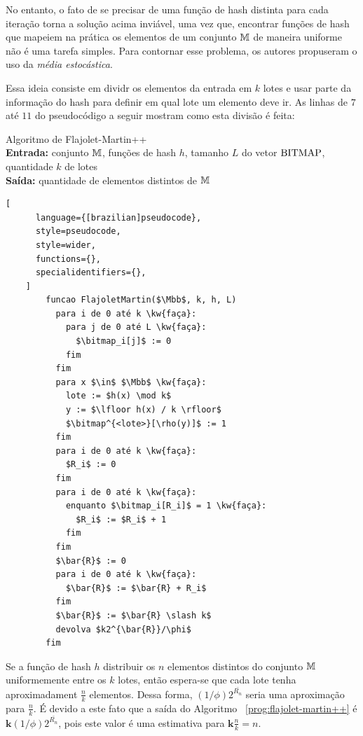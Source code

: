 No entanto, o fato de se precisar de uma função de hash distinta para cada iteração torna a solução acima inviável, 
uma vez que, encontrar funções de hash que mapeiem na prática os elementos de um conjunto $\mathbb{M}$ de maneira
uniforme não é uma tarefa simples. Para contornar esse problema, os autores propuseram o uso da 
\textit{média estocástica}.

Essa ideia consiste em dividr os elementos da entrada em $k$ lotes e usar parte da informação do hash para definir em 
qual lote um elemento deve ir. 
As linhas de $7$ até $11$ do pseudocódigo a seguir mostram como esta divisão é feita:
\begin{programruledcaption}{
  Algoritmo de Flajolet-Martin++
  \\ \textbf{Entrada:} conjunto $\mathbb{M}$, funções de hash $h$, tamanho $L$ do vetor $\text{BITMAP}$, 
  quantidade $k$ de lotes
  \\ \textbf{Saída:} quantidade de elementos distintos de $\mathbb{M}$
  \label{prog:flajolet-martin++}
  }
    \begin{lstlisting}[
      language={[brazilian]pseudocode},
      style=pseudocode,
      style=wider,
      functions={},
      specialidentifiers={},
    ]
        funcao FlajoletMartin($\Mbb$, k, h, L)
          para i de 0 até k \kw{faça}:
            para j de 0 até L \kw{faça}:
              $\bitmap_i[j]$ := 0
            fim
          fim
          para x $\in$ $\Mbb$ \kw{faça}:
            lote := $h(x) \mod k$
            y := $\lfloor h(x) / k \rfloor$
            $\bitmap^{<lote>}[\rho(y)]$ := 1
          fim
          para i de 0 até k \kw{faça}:
            $R_i$ := 0
          fim
          para i de 0 até k \kw{faça}:
            enquanto $\bitmap_i[R_i]$ = 1 \kw{faça}:
              $R_i$ := $R_i$ + 1
            fim
          fim
          $\bar{R}$ := 0
          para i de 0 até k \kw{faça}:
            $\bar{R}$ := $\bar{R} + R_i$ 
          fim
          $\bar{R}$ := $\bar{R} \slash k$
          devolva $k2^{\bar{R}}/\phi$
        fim
    \end{lstlisting}
  \end{programruledcaption}

Se a função de hash $h$ distribuir os $n$ elementos distintos do conjunto $\mathbb{M}$ uniformemente entre os 
$k$ lotes, então espera-se que cada lote tenha aproximadament $\frac{n}{k}$ elementos. Dessa forma, 
$(1 / \phi)2^{\bar{R_n}}$ seria uma aproximação para $\frac{n}{k}$. É devido a este fato que a saída do Algoritmo~
\ref{prog:flajolet-martin++} é $\mathbf{k} (1 / \phi)2^{\bar{R_n}}$, pois este valor é uma estimativa para 
$\mathbf{k} \frac{n}{k} = n$.

